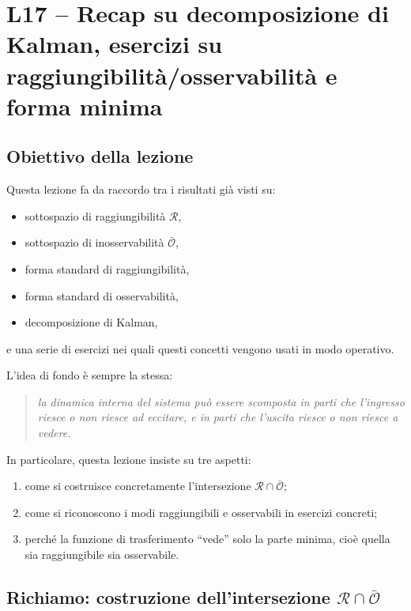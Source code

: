 \chapter{L17 -- Recap su decomposizione di Kalman, esercizi su raggiungibilità/osservabilità e forma minima}
\label{chap:L17}

\section{Obiettivo della lezione}

Questa lezione fa da raccordo tra i risultati già visti su:
\begin{itemize}
    \item sottospazio di raggiungibilità \(\mathcal R\),
    \item sottospazio di inosservabilità \(\bar{\mathcal O}\),
    \item forma standard di raggiungibilità,
    \item forma standard di osservabilità,
    \item decomposizione di Kalman,
\end{itemize}
e una serie di esercizi nei quali questi concetti vengono usati in modo operativo.

L'idea di fondo è sempre la stessa:
\begin{quote}
\emph{la dinamica interna del sistema può essere scomposta in parti che l'ingresso riesce o non riesce ad eccitare, e in parti che l'uscita riesce o non riesce a vedere.}
\end{quote}

In particolare, questa lezione insiste su tre aspetti:
\begin{enumerate}
    \item come si costruisce concretamente l'intersezione \(\mathcal R\cap\bar{\mathcal O}\);
    \item come si riconoscono i modi raggiungibili e osservabili in esercizi concreti;
    \item perché la funzione di trasferimento ``vede'' solo la parte minima, cioè quella sia raggiungibile sia osservabile.
\end{enumerate}

\bigskip

\section{Richiamo: costruzione dell'intersezione \(\mathcal R\cap\bar{\mathcal O}\)}


